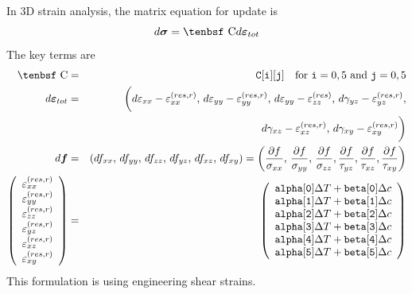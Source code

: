 \documentclass[11pt]{book}
\renewcommand{\vec}[1]{\boldsymbol{#1}}
\def\C{\hbox{\tenbsf C}}
\def\code#1{{\small\tt #1}}
\def\deff{d \vec{\varepsilon}_{tot}}
\def\df{d \vec{f}}
\def\dsig{d \vec{\sigma}}
\def\DT{\Delta T}
\def\e#1{\varepsilon_{#1}}
\def\er#1{\varepsilon_{#1}^{(res)}}
\def\err#1{\varepsilon_{#1}^{(res,r)}}
\def\g#1{\gamma_{#1}}
\begin{document}
In 3D strain analysis, the matrix equation for update is
\begin{equation}
    \dsig = \C \deff 
\end{equation}
The key terms are
\begin{eqnarray}
      \C & = & \code{C[i][j]} \quad {\rm for\ }\code{i}=0,5\ {\rm and\ }\code{j}=0,5 \\
       \deff & = & \biggl(d\e{xx} - \err{xx}, \thinspace d\e{yy} - \err{yy}, \thinspace  d\e{yy}-  \er{zz}, 
             \thinspace d\g{yz}-\err{yz},  \nonumber\\
             && \qquad\mbox{} \thinspace d\g{xz}-\err{xz},  \thinspace d\g{xy}-\err{xy}\biggr) \\
      \df & = & (df_{xx}, \thinspace df_{yy}, \thinspace df_{zz}, \thinspace df_{yz}, \thinspace df_{xz}, \thinspace df_{xy})
                  = \left({\partial f\over \sigma_{xx}}, \thinspace {\partial f\over \sigma_{yy}}, \thinspace {\partial f\over \sigma_{zz}},
                                {\partial f\over \tau_{yz}}, {\partial f\over \tau_{xz}}, {\partial f\over \tau_{xy}}\right)  \\
\left(\begin{array}{c} \err{xx} \\ \err{yy} \\ \err{zz} \\  \err{yz} \\ \err{xz} \\ \err{xy} \end{array}\right)
       & = &  \left(\begin{array}{c}
	\code{alpha[0]}\DT + \code{beta[0]}\Delta c \\
	\code{alpha[1]}\DT + \code{beta[1]}\Delta c \\
	\code{alpha[2]}\DT + \code{beta[2]}\Delta c \\
	\code{alpha[3]}\DT + \code{beta[3]}\Delta c \\
	\code{alpha[4]}\DT + \code{beta[4]}\Delta c \\
	\code{alpha[5]}\DT + \code{beta[5]}\Delta c 
 \end{array}\right) 
 \end{eqnarray}
This formulation is using engineering shear strains. 
 
\end{document}
